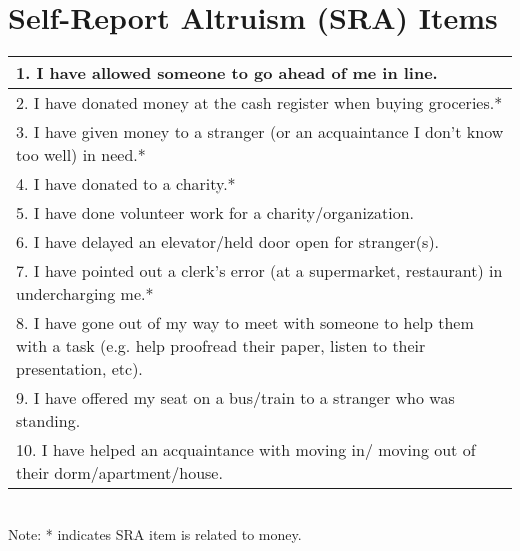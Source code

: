\section{Self-Report Altruism (SRA) Items}
\vspace{8mm} 

\begin{tabular}{ | p{12cm} | }
\hline

1. I have allowed someone to go ahead of me in line.\\
\hline
2. I have donated money at the cash register when buying groceries.*\\
\hline
3. I have given money to a stranger (or an acquaintance I don\rq t know too well) in need.*\\ 
\hline
4. I have donated to a charity.*\\
\hline
5. I have done volunteer work for a charity/organization.\\
\hline
6. I have delayed an elevator/held door open for stranger(s).\\
\hline
7.  I have pointed out a clerk\rq s error (at a supermarket, restaurant) in undercharging me.*\\
\hline
8. I have gone out of my way to meet with someone to help them with a task (e.g. help proofread their paper, listen to their presentation, etc). \\
\hline
9. I have offered my seat on a bus/train to a stranger who was standing.\\
\hline
10. I have helped an acquaintance with moving in/ moving out of their dorm/apartment/house.\\
\hline
\end{tabular} \\
\small Note: * indicates SRA item is related to money. \\ \\

